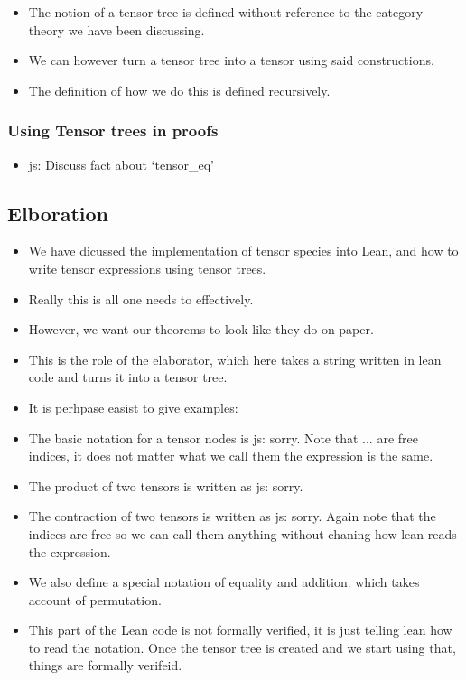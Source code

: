 \documentclass[a4paper, 11pt]{article}
\newcommand{\js}[1]{ {\color{magenta} js:  #1}}
\begin{document}
\begin{itemize}
  \item The notion of a tensor tree is defined without reference to the category theory 
    we have been discussing. 
  \item We can however turn a tensor tree into a tensor using said constructions. 
  \item The definition of how we do this is defined recursively. 
\end{itemize}

\subsubsection{Using Tensor trees in proofs}
\begin{itemize}
  \item \js{Discuss fact about `tensor\_eq'}
\end{itemize}
\subsection{Elboration}
\begin{itemize}
  \item We have dicussed the implementation of tensor species into Lean, and how to write
    tensor expressions using tensor trees.
  \item Really this is all one needs to effectively. 
  \item However, we want our theorems to look like they do on paper. 
  \item This is the role of the elaborator, which here takes a string written in lean code 
    and turns it into a tensor tree.
  \item It is perhpase easist to give examples: 
  \item The basic notation for a tensor nodes is \js{sorry}. Note that ... are free indices, 
    it does not matter what we call them the expression is the same. 
  \item The product of two tensors is written as \js{sorry}.
  \item The contraction of two tensors is written as \js{sorry}. Again note that the indices 
    are free so we can call them anything without chaning how lean reads the expression. 
  \item We also define a special notation of equality and addition. which takes account of permutation.
  \item This part of the Lean code is not formally verified, it is just telling lean how to 
    read the notation. Once the tensor tree is created and we start using that, things are formally 
    verifeid.
\end{itemize}
\end{document}
